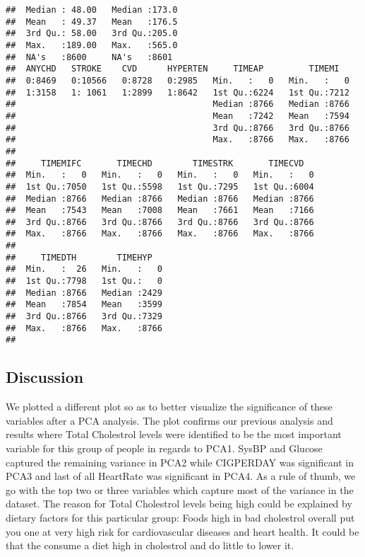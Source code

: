 \documentclass[]{article}
\begin{document}
\begin{verbatim}
##  Median : 48.00   Median :173.0                                       
##  Mean   : 49.37   Mean   :176.5                                       
##  3rd Qu.: 58.00   3rd Qu.:205.0                                       
##  Max.   :189.00   Max.   :565.0                                       
##  NA's   :8600     NA's   :8601                                        
##  ANYCHD   STROKE    CVD      HYPERTEN     TIMEAP         TIMEMI    
##  0:8469   0:10566   0:8728   0:2985   Min.   :   0   Min.   :   0  
##  1:3158   1: 1061   1:2899   1:8642   1st Qu.:6224   1st Qu.:7212  
##                                       Median :8766   Median :8766  
##                                       Mean   :7242   Mean   :7594  
##                                       3rd Qu.:8766   3rd Qu.:8766  
##                                       Max.   :8766   Max.   :8766  
##                                                                    
##     TIMEMIFC       TIMECHD        TIMESTRK       TIMECVD    
##  Min.   :   0   Min.   :   0   Min.   :   0   Min.   :   0  
##  1st Qu.:7050   1st Qu.:5598   1st Qu.:7295   1st Qu.:6004  
##  Median :8766   Median :8766   Median :8766   Median :8766  
##  Mean   :7543   Mean   :7008   Mean   :7661   Mean   :7166  
##  3rd Qu.:8766   3rd Qu.:8766   3rd Qu.:8766   3rd Qu.:8766  
##  Max.   :8766   Max.   :8766   Max.   :8766   Max.   :8766  
##                                                             
##     TIMEDTH        TIMEHYP    
##  Min.   :  26   Min.   :   0  
##  1st Qu.:7798   1st Qu.:   0  
##  Median :8766   Median :2429  
##  Mean   :7854   Mean   :3599  
##  3rd Qu.:8766   3rd Qu.:7329  
##  Max.   :8766   Max.   :8766  
## 
\end{verbatim}

\subsection{Discussion}\label{discussion}

We plotted a different plot so as to better visualize the significance
of these variables after a PCA analysis. The plot confirms our previous
analysis and results where Total Cholestrol levels were identified to be
the most important variable for this group of people in regards to PCA1.
SysBP and Glucose captured the remaining variance in PCA2 while
CIGPERDAY was significant in PCA3 and last of all HeartRate was
significant in PCA4. As a rule of thumb, we go with the top two or three
variables which capture most of the variance in the dataset. The reason
for Total Cholestrol levels being high could be explained by dietary
factors for this particular group: Foods high in bad cholestrol overall
put you one at very high risk for cardiovascular diseases and heart
health. It could be that the consume a diet high in cholestrol and do
little to lower it.
\end{document}
